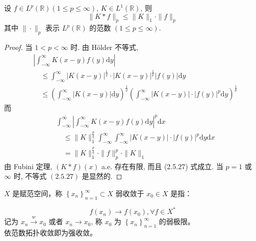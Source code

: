 \documentclass[lang=cn,newtx,10pt,scheme=chinese,thmcnt=chapter]{elegantbook}
\newcommand{\dif}{\mathrm{d}}
\begin{document}
\begin{theorem}设 $f \in L^p( \mathbb{R} )(1 \leqslant p \leqslant \infty)$, $K \in L^1( \mathbb{R} )$, 则
\begin{equation*}
\|K * f\|_p \leqslant\|K\|_1 \cdot\|f\|_p
\end{equation*}
其中 $\|\cdot\|_p$ 表示 $L^p( \mathbb{R} )$ 的范数 $(1 \leqslant p \leqslant \infty)$.
\end{theorem}

\begin{proof}
     当 $1<p<\infty$ 时. 由 Hölder 不等式,
\begin{equation*}
\begin{aligned}
& \left|\int_{-\infty}^{\infty} K(x-y) f(y) \dif y\right| \\
& \quad \leqslant \int_{-\infty}^{\infty}|K(x-y)|^{\frac{1}{q}} \cdot|K(x-y)|^{\frac{1}{p}}|f(y)| \dif y \\
& \quad \leqslant\left(\int_{-\infty}^{\infty}|K(x-y)| \dif y\right)^{\frac{1}{q}}\left(\int_{-\infty}^{\infty}|K(x-y)| \cdot|f(y)|^p \dif y\right)^{\frac{1}{p}}
\end{aligned}
\end{equation*}
而
\begin{equation*}
\begin{aligned}
& \int_{-\infty}^{\infty}\left|\int_{-\infty}^{\infty} K(x-y) f(y) \dif y\right|^p \dif x \\
& \quad \leqslant\|K\|_1^{\frac{p}{q}} \int_{-\infty}^{\infty} \int_{-\infty}^{\infty}|K(x-y)| \cdot|f(y)|^p \dif y \dif x \\
& \quad=\|K\|_1^{\frac{p}{q}} \cdot\|f\|_p^p \cdot\|K\|_1
\end{aligned}
\end{equation*}
由 Fubini 定理, $(K * f)(x)$ a.e. 存在有限, 而且 (2.5.27) 式成立.
当 $p=1$ 或 $\infty$ 时, 不等式 $(2.5 .27)$ 是显然的.
\end{proof}


\begin{definition}
$X$ 是赋范空间，称 $\left\{x_n\right\}_{n=1}^{\infty} \subset X$ 弱收敛于 $x_0 \in X$ 是指：

\begin{equation*}
f\left(x_n\right) \rightarrow f\left(x_0\right), \forall f \in X^*
\end{equation*}
记为 $x_n \xrightarrow{w} x_0$ 或者 $x_n \rightarrow x_0$, 称 $x_0$ 为 $\left\{x_n\right\}_{n=1}^{\infty}$ 的弱极限。\\
依范数拓扑收敛即为强收敛。


\end{definition}
\end{document}
